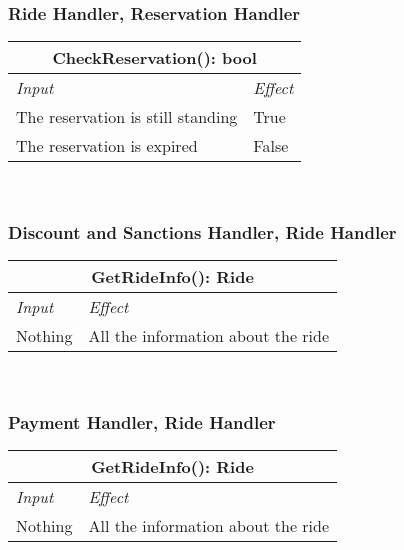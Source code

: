 		
		
		\subsubsection*{Ride Handler, Reservation Handler}
			\begin{tabular}{ |l|l| }
				\hline
				\multicolumn{2}{|c|}{CheckReservation(): bool}\\
				\hline
				\textit{Input} & \textit{Effect}\\ \hline
				The reservation is still standing & True\\ \hline
				The reservation is expired & False\\ \hline
			\end{tabular}
			\\
		
		
		
		\subsubsection*{Discount and Sanctions Handler, Ride Handler}
			\begin{tabular}{ |l|l| }
				\hline
				\multicolumn{2}{|c|}{GetRideInfo(): Ride}\\
				\hline
				\textit{Input} & \textit{Effect}\\ \hline
				Nothing & All the information about the ride\\ \hline
			\end{tabular}
			\\
		
		
		
		\subsubsection*{Payment Handler, Ride Handler}
			\begin{tabular}{ |l|l| }
				\hline
				\multicolumn{2}{|c|}{GetRideInfo(): Ride}\\
				\hline
				\textit{Input} & \textit{Effect}\\ \hline
				Nothing & All the information about the ride\\ \hline
			\end{tabular}
			\\
		
		
		
